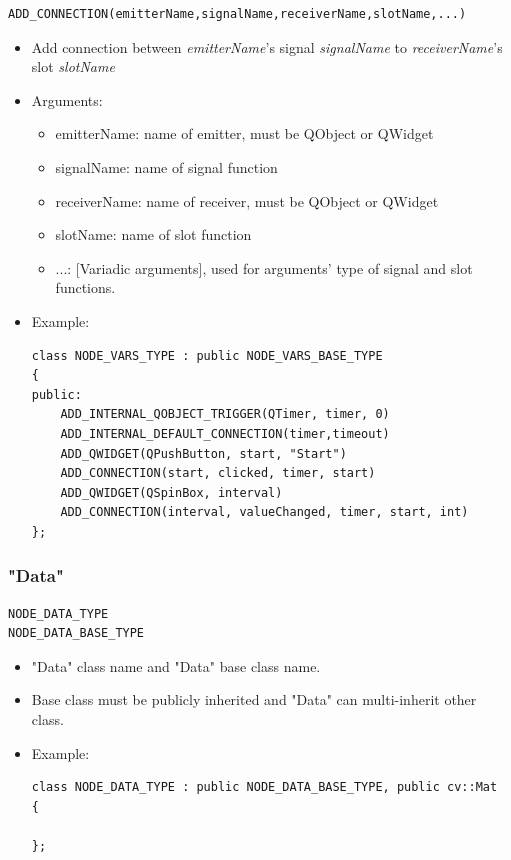 \documentclass[a4paper,10pt]{book}
\begin{document}
\begin{mdframed}
\begin{verbatim}
ADD_CONNECTION(emitterName,signalName,receiverName,slotName,...)
\end{verbatim}
\begin{itemize}
 \item Add connection between {\em{emitterName}}'s signal {\em{signalName}} to {\em{receiverName}}'s slot {\em{slotName}}
 \item Arguments:
 \begin{itemize}
  \item emitterName: name of emitter, must be QObject or QWidget
  \item signalName: name of signal function
  \item receiverName: name of receiver, must be QObject or QWidget
  \item slotName: name of slot function
  \item ...: [Variadic arguments], used for arguments' type of signal and slot functions. 
 \end{itemize}
 \item Example:
\begin{verbatim}
class NODE_VARS_TYPE : public NODE_VARS_BASE_TYPE
{
public:
    ADD_INTERNAL_QOBJECT_TRIGGER(QTimer, timer, 0)
    ADD_INTERNAL_DEFAULT_CONNECTION(timer,timeout)
    ADD_QWIDGET(QPushButton, start, "Start")
    ADD_CONNECTION(start, clicked, timer, start)
    ADD_QWIDGET(QSpinBox, interval)
    ADD_CONNECTION(interval, valueChanged, timer, start, int)
};
\end{verbatim}
\end{itemize}
\end{mdframed}

\subsubsection{"Data"}

\begin{mdframed}
\begin{verbatim}
NODE_DATA_TYPE
NODE_DATA_BASE_TYPE
\end{verbatim}
\begin{itemize}
 \item "Data" class name and "Data" base class name.
 \item Base class must be publicly inherited and "Data" can multi-inherit other class. 
\end{itemize}
\begin{itemize}
 \item Example:
 \begin{verbatim}
class NODE_DATA_TYPE : public NODE_DATA_BASE_TYPE, public cv::Mat
{

};
 \end{verbatim}
\end{itemize}
\end{mdframed}
\end{document}
